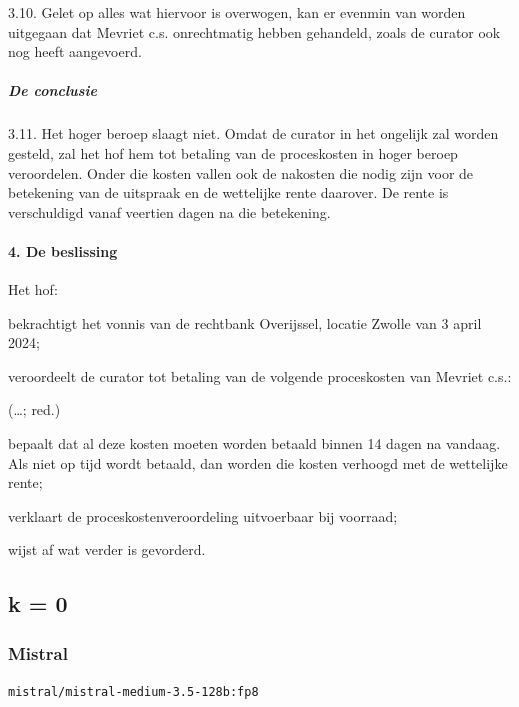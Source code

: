 \documentclass[
  dutch,
  a4paper,
]{article}
\begin{document}
3.10. Gelet op alles wat hiervoor is overwogen, kan er evenmin van worden uitgegaan dat Mevriet c.s. onrechtmatig hebben gehandeld, zoals de curator ook nog heeft aangevoerd.

\subparagraph{De conclusie}\label{de-conclusie}

3.11. Het hoger beroep slaagt niet. Omdat de curator in het ongelijk zal worden gesteld, zal het hof hem tot betaling van de proceskosten in hoger beroep veroordelen. Onder die kosten vallen ook de nakosten die nodig zijn voor de betekening van de uitspraak en de wettelijke rente daarover. De rente is verschuldigd vanaf veertien dagen na die betekening.

\paragraph{4. De beslissing}\label{de-beslissing-1}

Het hof:

bekrachtigt het vonnis van de rechtbank Overijssel, locatie Zwolle van 3 april 2024;

veroordeelt de curator tot betaling van de volgende proceskosten van Mevriet c.s.:

(\ldots; red.)

bepaalt dat al deze kosten moeten worden betaald binnen 14 dagen na vandaag. Als niet op tijd wordt betaald, dan worden die kosten verhoogd met de wettelijke rente;

verklaart de proceskostenveroordeling uitvoerbaar bij voorraad;

wijst af wat verder is gevorderd.

\newpage


\subsection{k = 0}\label{k-0-1}

\subsubsection{Mistral}\label{mistral-3}

\texttt{mistral/mistral-medium-3.5-128b:fp8}
\end{document}
